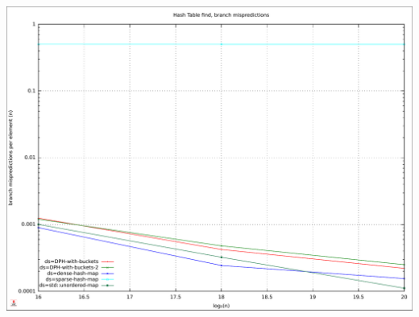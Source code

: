 \documentclass{article}
\begin{document}
\includegraphics[width=\linewidth]{img/hash_find_branchmiss}
\raggedright
\end{document}
